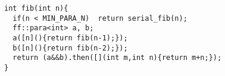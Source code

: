  \centering
\begin{lstlisting}[mathescape]
int fib(int n){
  if(n < MIN_PARA_N)  return serial_fib(n);
  ff::para<int> a, b;
  a([n](){return fib(n-1);});
  b([n](){return fib(n-2);});
  return (a&&b).then([](int m,int n){return m+n;});
}
\end{lstlisting}
